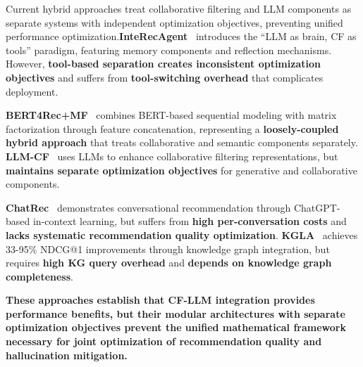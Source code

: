 \documentclass[acmsmall]{acmart}
\begin{document}
Current hybrid approaches treat collaborative filtering and LLM components as separate systems with independent optimization objectives, preventing unified performance optimization.\textbf{InteRecAgent}~\cite{liu2023interecagent} introduces the ``LLM as brain, CF as tools'' paradigm, featuring memory components and reflection mechanisms. However, \textbf{tool-based separation creates inconsistent optimization objectives} and suffers from \textbf{tool-switching overhead} that complicates deployment.

\textbf{BERT4Rec+MF}~\cite{sun2021bert4rec} combines BERT-based sequential modeling with matrix factorization through feature concatenation, representing a \textbf{loosely-coupled hybrid approach} that treats collaborative and semantic components separately. \textbf{LLM-CF}~\cite{wu2024llm} uses LLMs to enhance collaborative filtering representations, but \textbf{maintains separate optimization objectives} for generative and collaborative components.

\textbf{ChatRec}~\cite{gao2023chat} demonstrates conversational recommendation through ChatGPT-based in-context learning, but suffers from \textbf{high per-conversation costs} and \textbf{lacks systematic recommendation quality optimization}. \textbf{KGLA}~\cite{kgla2024} achieves 33-95\% NDCG@1 improvements through knowledge graph integration, but requires \textbf{high KG query overhead} and \textbf{depends on knowledge graph completeness}.

\textbf{These approaches establish that CF-LLM integration provides performance benefits, but their modular architectures with separate optimization objectives prevent the unified mathematical framework necessary for joint optimization of recommendation quality and hallucination mitigation.}



\end{document}
